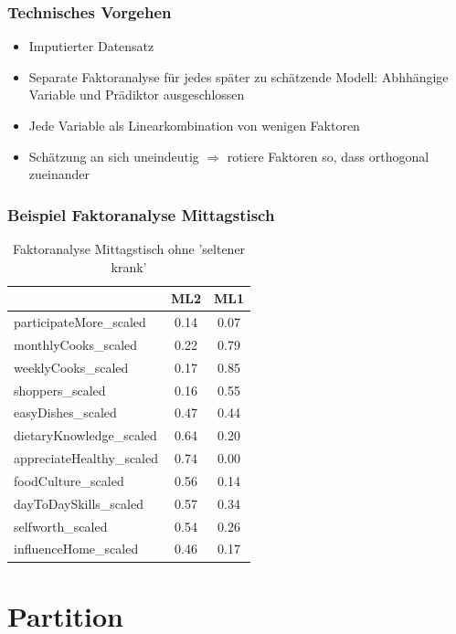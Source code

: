 \begin{frame}[fragile]
\frametitle{Technisches Vorgehen}

\begin{itemize}
 \item<1-> Imputierter Datensatz 
 \item<2-> Separate Faktoranalyse für jedes später zu schätzende Modell: Abhhängige Variable und Prädiktor ausgeschlossen
 \item<3-> Jede Variable als Linearkombination von wenigen Faktoren
 \item<4-> Schätzung an sich uneindeutig $\Rightarrow$ rotiere Faktoren so, dass orthogonal zueinander
\end{itemize}

\end{frame}

\begin{frame}[fragile]
\frametitle{Beispiel Faktoranalyse Mittagstisch}
\begin{table}[ht]
\centering
\begin{tabular}{lcc}
  \hline
 & ML2 & ML1 \\ 
  \hline
participateMore\_scaled & 0.14 & 0.07 \\ 
  monthlyCooks\_scaled & 0.22 & 0.79 \\ 
  weeklyCooks\_scaled & 0.17 & 0.85 \\ 
  shoppers\_scaled & 0.16 & 0.55 \\ 
  easyDishes\_scaled & 0.47 & 0.44 \\ 
  dietaryKnowledge\_scaled & 0.64 & 0.20 \\ 
  appreciateHealthy\_scaled & 0.74 & 0.00 \\ 
  foodCulture\_scaled & 0.56 & 0.14 \\ 
  dayToDaySkills\_scaled & 0.57 & 0.34 \\ 
  selfworth\_scaled & 0.54 & 0.26 \\ 
  influenceHome\_scaled & 0.46 & 0.17 \\ 
   \hline
\end{tabular}
\caption{Faktoranalyse Mittagstisch ohne 'seltener krank'} 
\label{factor-analysis-example}
\end{table}



\end{frame}

\section{Partition}

